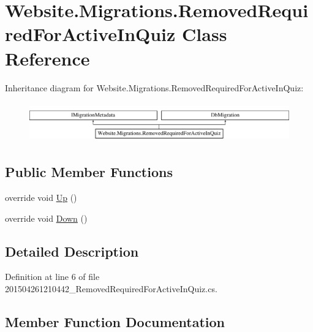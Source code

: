 \hypertarget{class_website_1_1_migrations_1_1_removed_required_for_active_in_quiz}{}\section{Website.\+Migrations.\+Removed\+Required\+For\+Active\+In\+Quiz Class Reference}
\label{class_website_1_1_migrations_1_1_removed_required_for_active_in_quiz}
Inheritance diagram for Website.\+Migrations.\+Removed\+Required\+For\+Active\+In\+Quiz\+:\begin{figure}[H]
\begin{center}
\leavevmode
\includegraphics[height=1.723077cm]{class_website_1_1_migrations_1_1_removed_required_for_active_in_quiz}
\end{center}
\end{figure}
\subsection*{Public Member Functions}
\begin{DoxyCompactItemize}
\item 
override void \hyperlink{class_website_1_1_migrations_1_1_removed_required_for_active_in_quiz_a5660feefcc7a99d2143e6c7e14cc5a55}{Up} ()
\item 
override void \hyperlink{class_website_1_1_migrations_1_1_removed_required_for_active_in_quiz_ad3866402204285cf8c0cf916926d91a8}{Down} ()
\end{DoxyCompactItemize}


\subsection{Detailed Description}


Definition at line 6 of file 201504261210442\+\_\+\+Removed\+Required\+For\+Active\+In\+Quiz.\+cs.



\subsection{Member Function Documentation}
\hypertarget{class_website_1_1_migrations_1_1_removed_required_for_active_in_quiz_ad3866402204285cf8c0cf916926d91a8}{}
